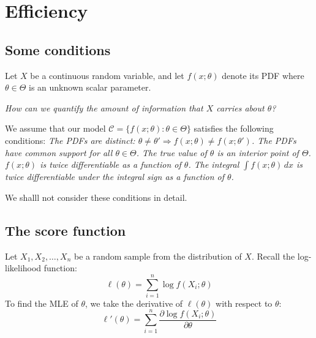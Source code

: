 \chapter{Efficiency}\label{chap:efficiency}
\setcounter{page}{1}
\startcontents[chapters]
\chapcontents


\section{Some conditions}
Let $X$ be a continuous random variable, and let $f(x;\theta)$ denote its PDF where $\theta\in\Theta$ is an unknown scalar parameter.

\vspace{1.5ex}
\bit
\it How can we quantify the amount of information that $X$ carries about $\theta$?
\eit

\vspace{1.5ex}
We assume that our model $\mathcal{C} = \{f(x;\theta):\theta\in\Theta\}$ satisfies the following conditions:
\ben
\it The PDFs are distinct: $\theta\neq\theta' \Rightarrow f(x;\theta)\neq f(x;\theta')$.
\it The PDFs have common support for all $\theta\in\Theta$.
\it The true value of $\theta$ is an interior point of $\Theta$.
\it $f(x;\theta)$ is twice differentiable as a function of $\theta$.
\it The integral $\int f(x;\theta)\,dx$ is twice differentiable under the integral sign as a function of $\theta$.
\een

\vspace{2ex}
We shalll not consider these conditions in detail.


\section{The score function}
Let $X_1,X_2,\ldots,X_n$ be a random sample from the distribution of $X$. Recall the log-likelihood function:
\[
\ell(\theta) = \sum_{i=1}^n \log f(X_i;\theta)
\]
To find the MLE of $\theta$, we take the derivative of $\ell(\theta)$ with respect to $\theta$:
\[
\ell'(\theta) = \sum_{i=1}^n \frac{\partial\log f(X_i;\theta)}{\partial\theta} 
\]

